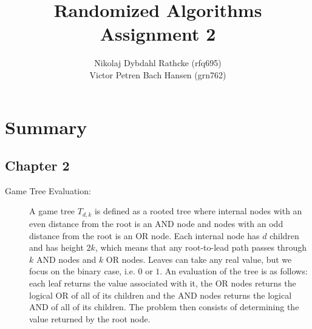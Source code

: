 \documentclass[a4paper]{article}
\author{Nikolaj Dybdahl Rathcke (rfq695) \\ Victor Petren Bach Hansen (grn762)}
\title{Randomized Algorithms \\ Assignment 2}
\begin{document}
\maketitle

\section*{Summary}
\subsection*{Chapter 2}
\begin{description}
  \item[Game Tree Evaluation:] A game tree $T_{d,k}$ is defined as a rooted tree where internal nodes with an even distance from the root is an AND node and nodes with an odd distance from the root is an OR node. Each internal node has $d$ children and has height $2k$, which means that any root-to-lead path passes through $k$ AND nodes and $k$ OR nodes. Leaves can take any real value, but we focus on the binary case, i.e. $0$ or $1$. An evaluation of the tree is as follows: each leaf
    returns the value associated with it, the OR nodes returns the logical OR of all of its children and the AND nodes returns the logical AND of all of its children. The problem then consists of determining the value returned by the root node.


\end{description}
\end{document}
